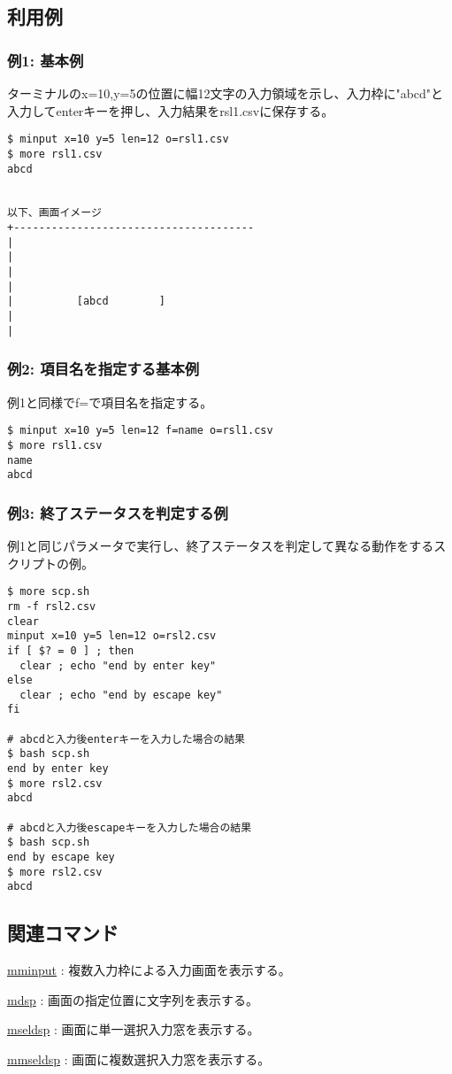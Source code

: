\subsection*{利用例}

\subsubsection*{例1: 基本例}

ターミナルのx=10,y=5の位置に幅12文字の入力領域を示し、入力枠に"abcd"と入力してenterキーを押し、入力結果をrsl1.csvに保存する。

\begin{Verbatim}[baselinestretch=0.7,frame=single]
$ minput x=10 y=5 len=12 o=rsl1.csv
$ more rsl1.csv
abcd


以下、画面イメージ
+--------------------------------------
|
|
|
|
|          [abcd        ]
|
|
\end{Verbatim}

\subsubsection*{例2: 項目名を指定する基本例}

例1と同様でf=で項目名を指定する。

\begin{Verbatim}[baselinestretch=0.7,frame=single]
$ minput x=10 y=5 len=12 f=name o=rsl1.csv
$ more rsl1.csv
name
abcd
\end{Verbatim}


\subsubsection*{例3: 終了ステータスを判定する例}

例1と同じパラメータで実行し、終了ステータスを判定して異なる動作をするスクリプトの例。

\begin{Verbatim}[baselinestretch=0.7,frame=single]
$ more scp.sh
rm -f rsl2.csv
clear
minput x=10 y=5 len=12 o=rsl2.csv
if [ $? = 0 ] ; then
  clear ; echo "end by enter key"
else
  clear ; echo "end by escape key"
fi

# abcdと入力後enterキーを入力した場合の結果
$ bash scp.sh
end by enter key
$ more rsl2.csv
abcd

# abcdと入力後escapeキーを入力した場合の結果
$ bash scp.sh
end by escape key
$ more rsl2.csv
abcd
\end{Verbatim}

\subsection*{関連コマンド}
\hyperref[sect:mminput] {mminput} : 複数入力枠による入力画面を表示する。

\hyperref[sect:mdsp] {mdsp} : 画面の指定位置に文字列を表示する。

\hyperref[sect:mseldsp] {mseldsp} : 画面に単一選択入力窓を表示する。

\hyperref[sect:mmseldsp] {mmseldsp} : 画面に複数選択入力窓を表示する。


%

